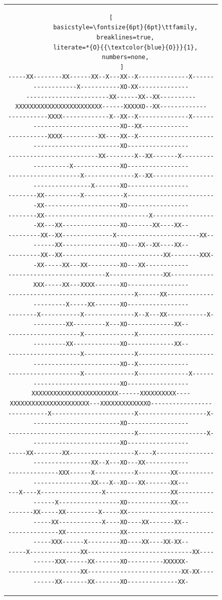 \documentclass[12pt,a4paper]{article}
\begin{document}
\begin{figure}[H]
\begin{tabular}{c}
\begin{lstlisting}[
        basicstyle=\fontsize{6pt}{6pt}\ttfamily,
        breaklines=true,
        literate=*{O}{{\textcolor{blue}{O}}}{1},
        numbers=none,
      ]
-----XX--------XX------XX--X---XX--X--------------X------------------X-----------XO-XX--------------
-----------------------XX------XX--XX----------XXXXXXXXXXXXXXXXXXXXXXXX------XXXXXO--XX-------------
-----------XXXX-------------X--XX--X--------------X------------------------------XO--XX-------------
-----------XXXX----------XX----XX--X---------------------------------------------XO-----------------
-------------------------XX--------X--XX-------X-------------------X-------------XO-----------------
--------------------X--------------X--XX---------------------------------X-------XO-----------------
--------XX----------X-----------X-------------------------XX---------------------XO-----------------
--------XX-----------------------------X------------------XX---XX----------------XO-------XX----XX--
---------XX--XX--------------X-----------------------XX--------XX----------------XO---XX--XX----XX--
---------XX--XX----------------------------XX--------XXX--XX-----XX---XX---------XO---XX------------
---------------------------X---------------XX------------XXX-----XX---XXXX-------XO-----------------
-----------------------------------X------XX----------------------X-----XX-------XO-----------------
--------X-----------X--------------X--X---XX-----------X----------XX---------X---XO-------------XX--
--------------------X--------------X------------------------------XX-------------XO-------------XX--
--------------------X--------------X---------------------------------------------XO--X--------------
--------------------X--------------X--------------X------------------------------XO-----------------
XXXXXXXXXXXXXXXXXXXXXXXX------XXXXXXXXXX----XXXXXXXXXXXXXXXXXXXXXX---XXXXXXXXXXXXXO-----------------
-----------X-----------------------X-------------------X-------------------------XO-----------------
-----------------------------------X-------------------X-------------------------XO-----------------
-----XX--------XX------------------X----X--------------------------------XX--X---XO---XX------------
--------------XXX------X-----------X---------XX--------------------------XX---X--XO---XX-------XX---
---X----X-----------------X------------------XX----------------X-----------------XO------------XX---
-------XX-----XX---------X-----XX-----------------------------XX------------X----XO----XX-------XX--
--------------XX---------------XX-----------------------------XXX------X---------XO----XX----XX-XX--
-----X--------------XX-----------------------------XX----------XXX------XX-------XO----------XXXXXX-
--------------------XX--------------------------XX-XX----------XX-------XX-------XO--------------XX-

\end{lstlisting}
\end{tabular}
\end{figure}
\end{document}
